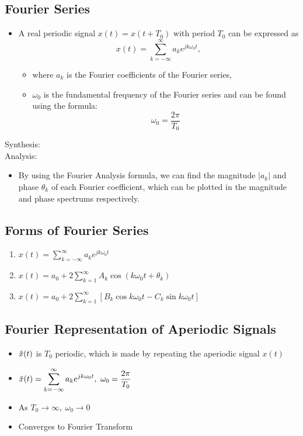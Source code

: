 \documentclass[a4paper]{article}
\begin{document}
\subsection{Fourier Series}
\begin{itemize}
    \item A real periodic signal $x(t) = x(t+T_0)$ with period $T_0$ can be expressed as
$$x(t) = \sum_{k=-\infty}^{\infty}a_k e^{jk\omega_0 t},$$
    \begin{itemize}[label=$\circ$]
        \item where $a_k$ is the Fourier coefficients of the Fourier series,
        \item $\omega_0$ is the fundamental frequency of the Fourier series and can be found using the formula:
        $$\omega_0 = \frac{2\pi}{T_0}$$
    \end{itemize}
\end{itemize}
Synthesis: \\
Analysis: 
\begin{itemize}
    \item By using the Fourier Analysis formula, we can find the magnitude $|a_k|$ and phase $\theta_k$ of each Fourier coefficient, which can be plotted in the magnitude and phase spectrums respectively.
\end{itemize}

\subsection{Forms of Fourier Series}
\begin{enumerate}
    \item $\displaystyle x(t) =\sum_{k=-\infty}^{\infty}a_k e^{jk\omega_0 t}$
    \item $\displaystyle x(t) = a_0 + 2\sum_{k=1}^{\infty}A_k\cos(k\omega_0 t+\theta_k)$
    \item $\displaystyle x(t) = a_0 + 2\sum_{k=1}^{\infty}[B_k\cos k\omega_0 t-C_k\sin k\omega_0 t]$
\end{enumerate}

\subsection{Fourier Representation of Aperiodic Signals}
\begin{itemize}
    \item $\Tilde{x}(t)$ is $T_0$ periodic, which is made by repeating the aperiodic signal $x(t)$
    \item $\displaystyle \Tilde{x}(t) = \sum_{k=-\infty}^{\infty}a_k e^{jk\omega_0 t}, \ \omega_0 = \frac{2\pi}{T_0}$
    \item As $T_0 \rightarrow \infty,\ \omega_0 \rightarrow 0$
    \item Converges to Fourier Transform
\end{itemize}
\end{document}
